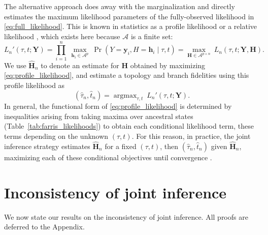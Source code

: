 \documentclass[11pt]{article}
\newcommand{\alphabet}{\mathcal{A}}
\newcommand{\fullAlignment}{\mathbf{Y}}
\newcommand{\alignmentColumn}{\mathbf{y}}
\newcommand{\alignmentColumnRV}{Y}
\newcommand{\fullAncestralStates}{\mathbf{H}}
\newcommand{\ancestralStateColumn}{\mathbf{h}}
\newcommand{\ancestralStateColumnRV}{H}
\newcommand{\nCols}{n}
\newcommand{\nAncestralStateRows}{p}
\DeclareMathOperator*{\argmax}{argmax}
\begin{document}
The alternative approach \citep{Sagulenko2018-xl} does away with the marginalization and directly estimates the maximum likelihood parameters of the fully-observed likelihood in \eqref{eq:full_likelihood}.
This is known in statistics as a profile likelihood \citep{Murphy2000-ry} or a relative likelihood \citep{Goldman1990-dk}, which exists here because $\alphabet$ is a finite set:
\begin{equation}
\label{eq:profile_likelihood}
L_\nCols'(\tau, t; \fullAlignment) = \prod_{i=1}^{\nCols} \ \max_{\ancestralStateColumn_i\in\alphabet^{\nAncestralStateRows}} \ \Pr(\alignmentColumnRV=\alignmentColumn_i, \ancestralStateColumnRV=\ancestralStateColumn_i \mid \tau, t) = \max_{\fullAncestralStates\in\alphabet^{\nAncestralStateRows\times\nCols}} \ L_\nCols(\tau, t; \fullAlignment, \fullAncestralStates).
\end{equation}
We use $\hat{\fullAncestralStates}_\nCols$ to denote an estimate for $\fullAncestralStates$ obtained by maximizing \eqref{eq:profile_likelihood}, and estimate a topology and branch fidelities using this profile likelihood as
\begin{equation}
\label{eq:profile_likelihood_topology_bl}
(\hat{\tau}_\nCols, \hat{t}_\nCols) = \argmax_{\tau, t} \ L_\nCols'(\tau, t; \fullAlignment).
\end{equation}
In general, the functional form of \eqref{eq:profile_likelihood} is determined by inequalities arising from taking maxima over ancestral states (Table~\ref{tab:farris_likelihoods}) to obtain each conditional likelihood term, these terms depending on the unknown $(\tau, t)$.
For this reason, in practice, the joint inference strategy estimates $\hat{\fullAncestralStates}_\nCols$ for a fixed $(\tau,t)$, then $(\hat{\tau}_\nCols,\hat{t}_\nCols)$ given $\hat{\fullAncestralStates}_\nCols$, maximizing each of these conditional objectives until convergence \citep{Sagulenko2018-xl}.


\section*{Inconsistency of joint inference}

We now state our results on the inconsistency of joint inference.
All proofs are deferred to the Appendix.
\end{document}
